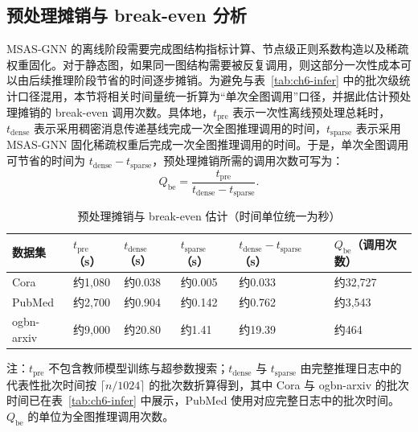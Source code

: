 \subsection{预处理摊销与 break-even 分析}
\label{subsec:ch6-breakeven}

MSAS-GNN 的离线阶段需要完成图结构指标计算、节点级正则系数构造以及稀疏权重固化。对于静态图，如果同一图结构需要被反复调用，则这部分一次性成本可以由后续推理阶段节省的时间逐步摊销。为避免与表~\ref{tab:ch6-infer} 中的批次级统计口径混用，本节将相关时间量统一折算为“单次全图调用”口径，并据此估计预处理摊销的 break-even 调用次数。具体地，$t_{\text{pre}}$ 表示一次性离线预处理总耗时，$t_{\text{dense}}$ 表示采用稠密消息传递基线完成一次全图推理调用的时间，$t_{\text{sparse}}$ 表示采用 MSAS-GNN 固化稀疏权重后完成一次全图推理调用的时间。于是，单次全图调用可节省的时间为 $t_{\text{dense}}-t_{\text{sparse}}$，预处理摊销所需的调用次数可写为：
\begin{equation}
Q_{\text{be}}=\frac{t_{\text{pre}}}{t_{\text{dense}}-t_{\text{sparse}}}.
\label{eq:ch6-breakeven}
\end{equation}

\begin{table}[htbp]
  \centering
  \caption{预处理摊销与 break-even 估计（时间单位统一为秒）}
  \label{tab:ch6-breakeven}
  \begin{threeparttable}
    \begin{tabular}{>{\centering\arraybackslash}m{1.84cm}
                    >{\centering\arraybackslash}m{1.84cm}
                    >{\centering\arraybackslash}m{1.84cm}
                    >{\centering\arraybackslash}m{1.84cm}
                    >{\centering\arraybackslash}m{2.39cm}
                    >{\centering\arraybackslash}m{2.01cm}}
      \toprule
      \textbf{数据集} & \textbf{$t_{\text{pre}}$（s）} & \textbf{$t_{\text{dense}}$（s）} & \textbf{$t_{\text{sparse}}$（s）} & \textbf{$t_{\text{dense}}-t_{\text{sparse}}$（s）} & \textbf{$Q_{\text{be}}$（调用次数）} \\
      \midrule
      Cora & 约1,080 & 约0.038 & 约0.005 & 约0.033 & 约32,727 \\
      PubMed & 约2,700 & 约0.904 & 约0.142 & 约0.762 & 约3,543 \\
      ogbn-arxiv & 约9,000 & 约20.80 & 约1.41 & 约19.39 & 约464 \\
      \bottomrule
    \end{tabular}
    \begin{tablenotes}
      \item 注：$t_{\text{pre}}$ 不包含教师模型训练与超参数搜索；$t_{\text{dense}}$ 与 $t_{\text{sparse}}$ 由完整推理日志中的代表性批次时间按 $\lceil n/1024\rceil$ 的批次数折算得到，其中 Cora 与 ogbn-arxiv 的批次时间已在表~\ref{tab:ch6-infer} 中展示，PubMed 使用对应完整日志中的批次时间。$Q_{\text{be}}$ 的单位为全图推理调用次数。
    \end{tablenotes}
  \end{threeparttable}
\end{table}

